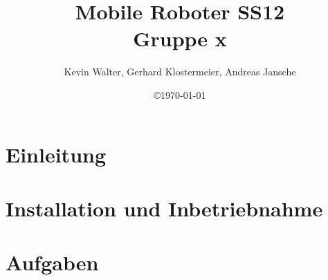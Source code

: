 \documentclass[a4paper,12pt]{scrartcl}[1970/01/01]
\title{Mobile Roboter SS12\\Gruppe x}
\author{Kevin Walter, Gerhard Klostermeier, Andreas Jansche}
\date{\copyright\space\today}
\begin{document}
\maketitle
\newpage

\tableofcontents
\newpage



\section{Einleitung}

\newpage

\section{Installation und Inbetriebnahme}

\newpage


\section{Aufgaben}

\newpage

%
\end{document}
